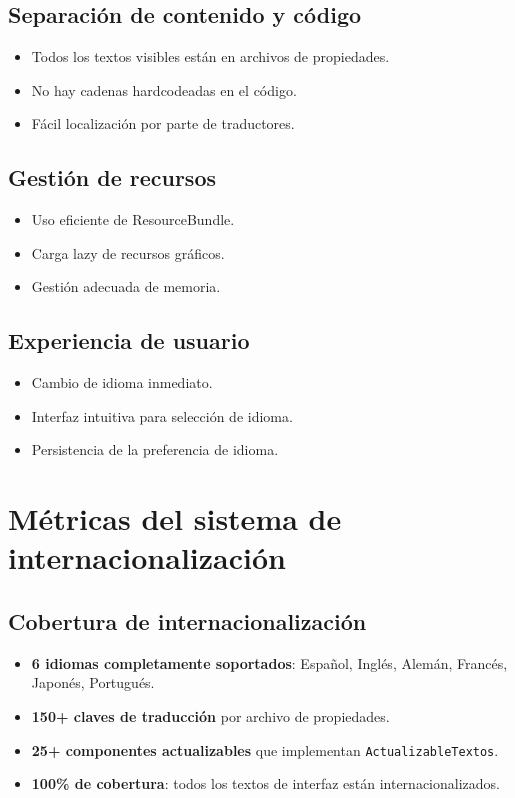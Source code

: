\subsection{Separación de contenido y código}

\begin{itemize}
    \item Todos los textos visibles están en archivos de propiedades.
    \item No hay cadenas hardcodeadas en el código.
    \item Fácil localización por parte de traductores.
\end{itemize}

\subsection{Gestión de recursos}

\begin{itemize}
    \item Uso eficiente de ResourceBundle.
    \item Carga lazy de recursos gráficos.
    \item Gestión adecuada de memoria.
\end{itemize}

\subsection{Experiencia de usuario}

\begin{itemize}
    \item Cambio de idioma inmediato.
    \item Interfaz intuitiva para selección de idioma.
    \item Persistencia de la preferencia de idioma.
\end{itemize}

\section{Métricas del sistema de internacionalización}

\subsection{Cobertura de internacionalización}

\begin{itemize}
    \item \textbf{6 idiomas completamente soportados}: Español, Inglés, Alemán, Francés, Japonés, Portugués.
    \item \textbf{150+ claves de traducción} por archivo de propiedades.
    \item \textbf{25+ componentes actualizables} que implementan \texttt{ActualizableTextos}.
    \item \textbf{100\% de cobertura}: todos los textos de interfaz están internacionalizados.
\end{itemize}

